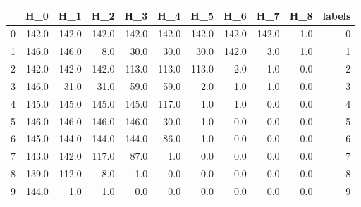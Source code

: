 \begin{tabular}{lrrrrrrrrrr}
\toprule
{} &    H\_0 &    H\_1 &    H\_2 &    H\_3 &    H\_4 &    H\_5 &    H\_6 &    H\_7 &  H\_8 &  labels \\
\midrule
0 &  142.0 &  142.0 &  142.0 &  142.0 &  142.0 &  142.0 &  142.0 &  142.0 &  1.0 &       0 \\
1 &  146.0 &  146.0 &    8.0 &   30.0 &   30.0 &   30.0 &  142.0 &    3.0 &  1.0 &       1 \\
2 &  142.0 &  142.0 &  142.0 &  113.0 &  113.0 &  113.0 &    2.0 &    1.0 &  0.0 &       2 \\
3 &  146.0 &   31.0 &   31.0 &   59.0 &   59.0 &    2.0 &    1.0 &    1.0 &  0.0 &       3 \\
4 &  145.0 &  145.0 &  145.0 &  145.0 &  117.0 &    1.0 &    1.0 &    0.0 &  0.0 &       4 \\
5 &  146.0 &  146.0 &  146.0 &  146.0 &   30.0 &    1.0 &    0.0 &    0.0 &  0.0 &       5 \\
6 &  145.0 &  144.0 &  144.0 &  144.0 &   86.0 &    1.0 &    0.0 &    0.0 &  0.0 &       6 \\
7 &  143.0 &  142.0 &  117.0 &   87.0 &    1.0 &    0.0 &    0.0 &    0.0 &  0.0 &       7 \\
8 &  139.0 &  112.0 &    8.0 &    1.0 &    0.0 &    0.0 &    0.0 &    0.0 &  0.0 &       8 \\
9 &  144.0 &    1.0 &    1.0 &    0.0 &    0.0 &    0.0 &    0.0 &    0.0 &  0.0 &       9 \\
\bottomrule
\end{tabular}
